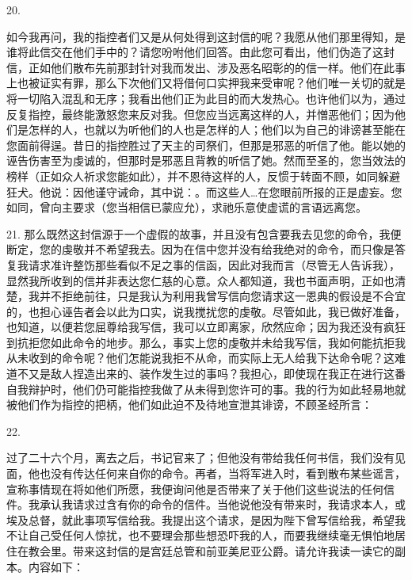 20. \par

如今我再问，我的指控者们又是从何处得到这封信的呢？我愿从他们那里得知，是谁将此信交在他们手中的？请您吩咐他们回答。由此您可看出，他们伪造了这封信，正如他们散布先前那封针对我而发出、涉及恶名昭彰的的信一样。他们在此事上也被证实有罪，那么下次他们又将借何口实押我来受审呢？他们唯一关切的就是将一切陷入混乱和无序；我看出他们正为此目的而大发热心。也许他们以为，通过反复指控，最终能激怒您来反对我。但您应当远离这样的人，并憎恶他们；因为他们是怎样的人，也就以为听他们的人也是怎样的人；他们以为自己的诽谤甚至能在您面前得逞。昔日的指控胜过了天主的司祭们，但那是邪恶的听信了他。能以她的诬告伤害至为虔诚的，但那时是邪恶且背教的听信了她。然而至圣的，您当效法的榜样（正如众人祈求您能如此），并不恩待这样的人，反惯于转面不顾，如同躲避狂犬。他说：因他谨守诫命，其中说：。而这些人…在您眼前所报的正是虚妄。您如同，曾向主要求（您当相信已蒙应允），求祂乐意使虚谎的言语远离您。\par

21. 那么既然这封信源于一个虚假的故事，并且没有包含要我去见您的命令，我便断定，您的虔敬并不希望我去。因为在信中您并没有给我绝对的命令，而只像是答复我请求准许整饬那些看似不足之事的信函，因此对我而言（尽管无人告诉我），显然我所收到的信并非表达您仁慈的心意。众人都知道，我也书面声明，正如也清楚，我并不拒绝前往，只是我认为利用我曾写信向您请求这一恩典的假设是不合宜的，也担心诬告者会以此为口实，说我搅扰您的虔敬。尽管如此，我已做好准备，也知道，以便若您屈尊给我写信，我可以立即离家，欣然应命；因为我还没有疯狂到抗拒您如此命令的地步。那么，事实上您的虔敬并未给我写信，我如何能抗拒我从未收到的命令呢？他们怎能说我拒不从命，而实际上无人给我下达命令呢？这难道不又是敌人捏造出来的、装作发生过的事吗？我担心，即使现在我正在进行这番自我辩护时，他们仍可能指控我做了从未得到您许可的事。我的行为如此轻易地就被他们作为指控的把柄，他们如此迫不及待地宣泄其诽谤，不顾圣经所言：\par

22. \par

过了二十六个月，离去之后，书记官来了；但他没有带给我任何书信，我们没有见面，他也没有传达任何来自你的命令。再者，当将军进入时，看到散布某些谣言，宣称事情现在将如他们所愿，我便询问他是否带来了关于他们这些说法的任何信件。我承认我请求过含有你的命令的信件。当他说他没有带来时，我请求本人，或埃及总督，就此事项写信给我。我提出这个请求，是因为陛下曾写信给我，希望我不让自己受任何人惊扰，也不要理会那些想恐吓我的人，而要我继续毫无惧怕地居住在教会里。带来这封信的是宫廷总管和前亚美尼亚公爵。请允许我读一读它的副本。内容如下：\par

